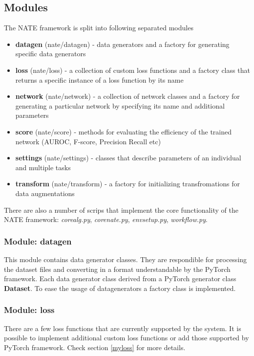 \documentclass[a4paper, 11pt]{article}
\begin{document}
\subsection{Modules}
The NATE framework is split into following separated modules
\begin{itemize}
    \item \textbf{datagen} (nate/datagen) - data generators and a factory for generating specific data generators
    \item \textbf{loss} (nate/loss) - a collection of custom loss functions and a factory class that returns a specific instance of a loss function by its name
    \item \textbf{network} (nate/network) - a collection of network classes and a factory for generating a particular network by specifying its name and additional parameters
    \item \textbf{score} (nate/score) - methods for evaluating the efficiency of the trained network (AUROC, F-score, Precision Recall etc)
    \item \textbf{settings} (nate/settings) - classes that describe parameters of an individual and multiple tasks
    \item \textbf{transform} (nate/transform) - a factory for initializing transfromations for data augmentations
\end{itemize}

There are also a number of scrips that implement the core functionality of the NATE framework: \textit{corealg.py}, \textit{corenate.py}, \textit{envsetup.py}, \textit{workflow.py}.

\subsubsection{Module: datagen} 
This module contains data generator classes. They are respondible for processing the dataset files and converting in a format understandable by the PyTorch framework. 
Each data generator class derived from a PyTorch generator class \textbf{Dataset}. To ease the usage of datagenerators a factory class is implemented. 

\subsubsection{Module: loss}
There are a few loss functions that are currently supported by the system. It is possible to implement additional custom loss functions or add those supported by PyTorch framework. Check section \ref{myloss} for more details.
\end{document}
